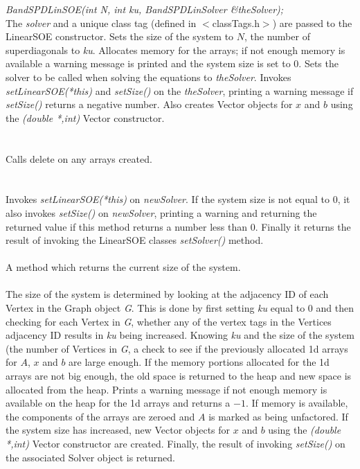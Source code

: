 {\em BandSPDLinSOE(int N, int ku, BandSPDLinSolver \&theSolver);}\\
The {\em solver} and a unique class tag (defined in $<$classTags.h$>$)
are passed to the LinearSOE constructor. 
Sets the size of the system to $N$, the number of superdiagonals to 
{\em ku}. Allocates memory for the arrays; if not enough
memory is available a warning message is printed and the system size
is set to $0$. Sets the solver to be called when solving the
equations to {\em theSolver}. Invokes {\em setLinearSOE(*this)} and
{\em setSize()} on the {\em theSolver}, printing a warning message if
{\em setSize()} returns a negative number. Also creates Vector objects
for $x$ and $b$ using the {\em (double *,int)} Vector constructor. \\


 \\
\\ 
Calls delete on any arrays created. \\

  \\
\\
Invokes {\em setLinearSOE(*this)} on {\em newSolver}.
If the system size is not equal to $0$, it also invokes {\em setSize()}
on {\em newSolver}, printing a warning and returning the returned value if this
method returns a number less than $0$. Finally it returns the result
of invoking the LinearSOE classes {\em setSolver()} method. \\

 \\
A method which returns the current size of the system. \\

 \\ 
The size of the system is determined by looking at the adjacency ID of
each Vertex in the Graph object {\em G}. This is done by first setting
{\em ku} equal to $0$ and then checking for each Vertex
in {\em G}, whether any of the vertex tags in the Vertices adjacency
ID results in {\em ku} being increased. Knowing {\em ku} and the size
of the system (the number of Vertices in {\em G}, a check to see if
the previously allocated 1d arrays for $A$, $x$ and $b$ are large
enough. If the memory portions allocated for the 1d arrays are not big
enough, the old space is returned to the heap and new space is
allocated from the heap. Prints a warning message if not enough
memory is available on the heap for the 1d arrays and returns a
$-1$. If memory is available, the components of the arrays are zeroed
and $A$ is marked as being unfactored. If the system size has
increased, new Vector objects for $x$ and $b$ using the {\em (double
*,int)} Vector constructor are created. Finally, the result of
invoking {\em setSize()} on the associated Solver object is
returned. \\ 


